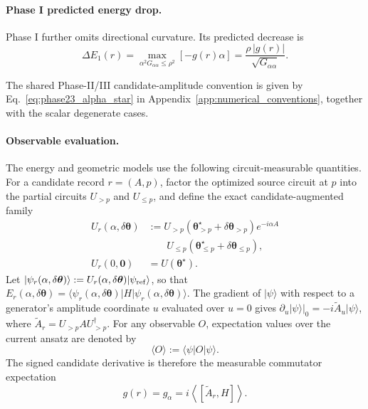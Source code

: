 \documentclass[
  reprint,
  amsmath,
  amssymb,
  aps,
  pra,
  nofootinbib,
  superscriptaddress,
  floatfix
]{revtex4-2}
\newcommand{\ket}[1]{|#1\rangle}
\newcommand{\bra}[1]{\langle #1|}
\begin{document}
\paragraph*{Phase I predicted energy drop.}
Phase I further omits directional curvature. Its predicted decrease is
\begin{equation}
\Delta E_1(r)
=\max_{\alpha^2G_{\alpha\alpha}\le\rho^2}[-g(r)\alpha]
=\frac{\rho\,|g(r)|}{\sqrt{G_{\alpha\alpha}}}.
\label{eq:phase1_gain}
\end{equation}

The shared Phase-II/III candidate-amplitude convention is given by
Eq.~\eqref{eq:phase23_alpha_star} in
Appendix~\ref{app:numerical_conventions}, together with the scalar degenerate
cases.

\paragraph*{Observable evaluation.}
%
The energy and geometric models use the following circuit-measurable quantities.
For a candidate record \(r=(A,p)\), factor the optimized source circuit at
\(p\) into the partial circuits \(U_{>p}\) and \(U_{\le p}\), and define
the exact candidate-augmented family
\begin{align*}
U_r(\alpha,\delta\boldsymbol{\theta})
&:=
U_{>p}\!\left(
\boldsymbol{\theta}_{>p}^{\star}
+\delta\boldsymbol{\theta}_{>p}
\right)
e^{-i\alpha A}\\[-0.2em]
&\phantom{{}:={}}\;
U_{\le p}\!\left(
\boldsymbol{\theta}_{\le p}^{\star}
+\delta\boldsymbol{\theta}_{\le p}
\right),\\
U_r(0,\mathbf 0)
&=U(\boldsymbol{\theta}^\star).
\end{align*}
Let
\(\ket{\psi_r(\alpha,\delta\boldsymbol\theta)}
:=U_r(\alpha,\delta\boldsymbol\theta)\ket{\psi_{\rm ref}}\), so that
\(E_r(\alpha,\delta\boldsymbol\theta)
=\bra{\psi_r(\alpha,\delta\boldsymbol\theta)}
H\ket{\psi_r(\alpha,\delta\boldsymbol\theta)}\).
The gradient of $\ket{\psi}$ with respect to a generator's amplitude coordinate $u$ evaluated over $u=0$ gives
\(\left.\partial_u\ket{\psi}\right|_0=-i\widetilde A_u\ket{\psi}\), where
\(\widetilde A_r=U_{>p}AU_{>p}^{\dagger}\).
For any observable \(O\), expectation values over the current ansatz are denoted by
\begin{equation*}
\langle O\rangle:=\langle\psi|O|\psi\rangle.
\end{equation*}
The signed candidate derivative is therefore the measurable commutator
expectation
\begin{equation}
g(r)=g_\alpha
=i\left\langle[\widetilde A_r,H]\right\rangle.
\label{eq:record_gradient}
\end{equation}
\end{document}
